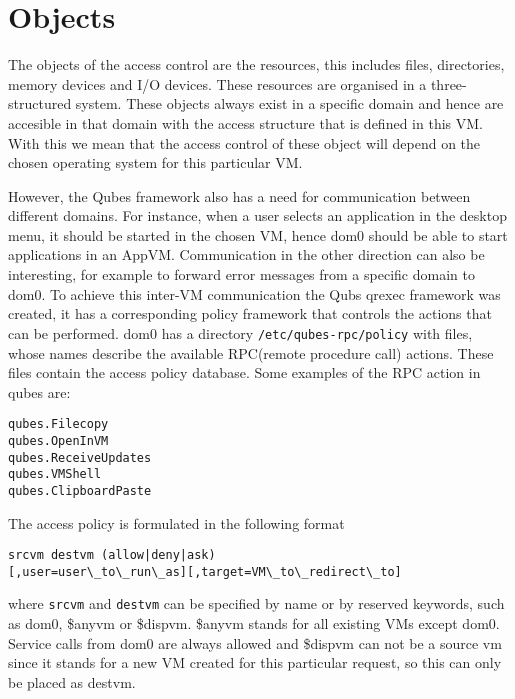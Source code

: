 \documentclass[runningheads,a4paper]{article}
\begin{document}
\section{Objects}

The objects of the access control are the resources, this includes
files, directories, memory devices and I/O devices. These resources
are organised in a three-structured system.  These
objects always exist in a specific domain and hence are accesible in
that domain with the access structure that is defined in this VM. With
this we mean that the access control of these object will depend on
the chosen operating system for this particular VM. 

However, the Qubes framework also has a need for communication between
different domains. For instance, when a user selects an application in
the desktop menu, it should be started in the chosen VM, hence dom0
should be able to start applications in an AppVM. Communication in the
other direction can also be interesting, for example to forward error
messages from a specific domain to dom0. To achieve this inter-VM
communication the Qubs qrexec framework was created, it has a
corresponding policy framework that controls the actions that can be
performed. dom0 has a directory \texttt{/etc/qubes-rpc/policy} with
files, whose names describe the available RPC(remote procedure call)
actions. These files contain the access policy database. Some examples
of the RPC action in qubes are:
\begin{verbatim}
qubes.Filecopy
qubes.OpenInVM
qubes.ReceiveUpdates
qubes.VMShell
qubes.ClipboardPaste
\end{verbatim} 
The access policy is formulated in the following format
\begin{verbatim}
srcvm destvm (allow|deny|ask)
[,user=user\_to\_run\_as][,target=VM\_to\_redirect\_to]
\end{verbatim}
where \texttt{srcvm} and \texttt{destvm} can be specified by name or
by reserved keywords, such as dom0, \$anyvm or \$dispvm. \$anyvm
stands for all existing VMs except dom0. Service calls
from dom0 are always allowed and \$dispvm can not be a source vm since
it stands for a new VM created for this particular request, so this
can only be placed as destvm.
\end{document}
